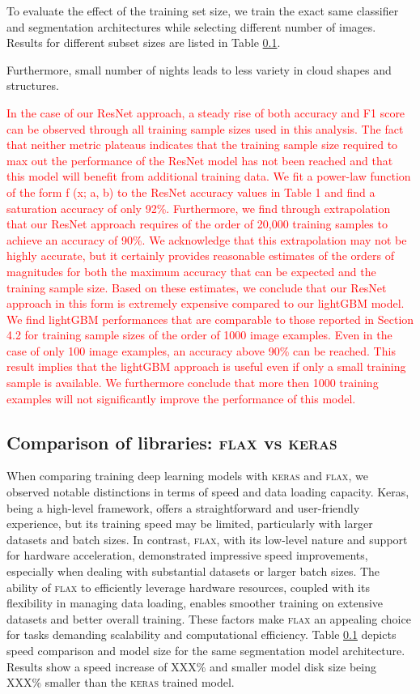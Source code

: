 \documentclass[amt, article]{copernicus}
\begin{document}
To evaluate the effect of the training set size, we train the exact same classifier and segmentation architectures while selecting different number of images. Results for different subset sizes are listed in Table \ref{}.

Furthermore, small number of nights leads to less variety in cloud shapes and structures.

\textcolor{red}{
In the case of our ResNet approach, a steady rise of both
accuracy and F1 score can be observed through all training
sample sizes used in this analysis. The fact that neither metric
plateaus indicates that the training sample size required to max
out the performance of the ResNet model has not been reached
and that this model will benefit from additional training data.
We fit a power-law function of the form f (x; a, b) to the ResNet accuracy values in Table 1
and find a saturation accuracy of only 92\%. Furthermore, we
find through extrapolation that our ResNet approach requires of
the order of 20,000 training samples to achieve an accuracy of
90\%. We acknowledge that this extrapolation may not be highly accurate, but it certainly provides reasonable estimates
of the orders of magnitudes for both the maximum accuracy
that can be expected and the training sample size. Based on
these estimates, we conclude that our ResNet approach in this
form is extremely expensive compared to our lightGBM model.
We find lightGBM performances that are comparable to
those reported in Section 4.2 for training sample sizes of the
order of 1000 image examples. Even in the case of only 100
image examples, an accuracy above 90\% can be reached. This
result implies that the lightGBM approach is useful even if only
a small training sample is available. We furthermore conclude
that more then 1000 training examples will not significantly
improve the performance of this model.}


\subsection{Comparison of libraries: \textsc{flax} vs \textsc{keras}}

When comparing training deep learning models with \textsc{keras} and \textsc{flax}, we observed notable distinctions in terms of speed and data loading capacity. Keras, being a high-level framework, offers a straightforward and user-friendly experience, but its training speed may be limited, particularly with larger datasets and batch sizes. In contrast, \textsc{flax}, with its low-level nature and support for hardware acceleration, demonstrated impressive speed improvements, especially when dealing with substantial datasets or larger batch sizes. The ability of \textsc{flax} to efficiently leverage hardware resources, coupled with its flexibility in managing data loading, enables smoother training on extensive datasets and better overall training. These factors make \textsc{flax} an appealing choice for tasks demanding scalability and computational efficiency. Table \ref{} depicts speed comparison and model size for the same segmentation model architecture. Results show a speed increase of XXX\% and smaller model disk size being XXX\% smaller than the \textsc{keras} trained model.
\end{document}
